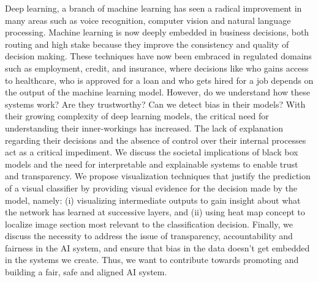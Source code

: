 %
%
%

\begin{publicabstract}

Deep learning, a branch of machine learning has seen a radical improvement in many areas such as voice recognition, computer vision and natural language processing. Machine learning is now deeply embedded in business decisions, both routing and high stake because they improve the consistency and quality of decision making. These techniques have now been embraced in regulated domains such as employment, credit, and insurance, where decisions like who gains access to healthcare, who is approved for a loan and who gets hired for a job depends on the output of the machine learning model. However, do we understand how these systems work? Are they trustworthy? Can we detect bias in their models? With their growing complexity of deep learning models,  the critical need for understanding their inner-workings has increased. The lack of explanation regarding their decisions and the absence of control over their internal processes act as a critical impediment. We discuss the societal implications of black box models and the need for interpretable and explainable systems to enable trust and transparency. We propose visualization techniques that justify the prediction of a visual classifier by providing visual evidence for the decision made by the model, namely: (i) visualizing intermediate outputs to gain insight about what the network has learned at successive layers, and (ii) using heat map concept to localize image section most relevant to the classification decision. Finally, we discuss the necessity to address the issue of transparency, accountability and fairness in the AI system, and ensure that bias in the data doesn't get embedded in the systems we create. Thus, we want to contribute towards promoting and building a fair, safe and aligned AI system.


\end{publicabstract}


